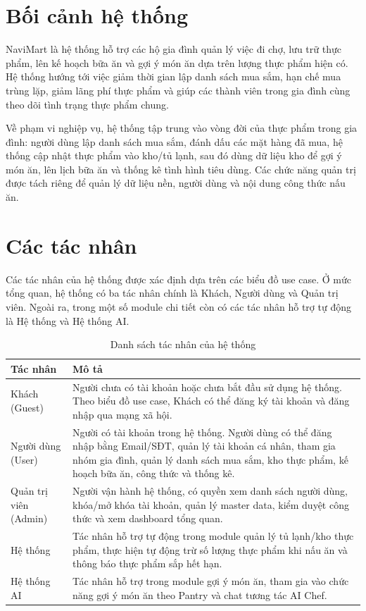 \section{Bối cảnh hệ thống}
NaviMart là hệ thống hỗ trợ các hộ gia đình quản lý việc đi chợ, lưu trữ thực phẩm, lên kế hoạch bữa ăn và gợi ý món ăn dựa trên lượng thực phẩm hiện có. Hệ thống hướng tới việc giảm thời gian lập danh sách mua sắm, hạn chế mua trùng lặp, giảm lãng phí thực phẩm và giúp các thành viên trong gia đình cùng theo dõi tình trạng thực phẩm chung.

Về phạm vi nghiệp vụ, hệ thống tập trung vào vòng đời của thực phẩm trong gia đình: người dùng lập danh sách mua sắm, đánh dấu các mặt hàng đã mua, hệ thống cập nhật thực phẩm vào kho/tủ lạnh, sau đó dùng dữ liệu kho để gợi ý món ăn, lên lịch bữa ăn và thống kê tình hình tiêu dùng. Các chức năng quản trị được tách riêng để quản lý dữ liệu nền, người dùng và nội dung công thức nấu ăn.

\section{Các tác nhân}
Các tác nhân của hệ thống được xác định dựa trên các biểu đồ use case. Ở mức tổng quan, hệ thống có ba tác nhân chính là Khách, Người dùng và Quản trị viên. Ngoài ra, trong một số module chi tiết còn có các tác nhân hỗ trợ tự động là Hệ thống và Hệ thống AI.

\begin{table}[H]
    \centering
    \caption{Danh sách tác nhân của hệ thống}
    \begin{tabular}{|p{3.4cm}|p{9.9cm}|}
        \hline
        \cellcolor[HTML]{D5F5E3}\textbf{Tác nhân} & \cellcolor[HTML]{D5F5E3}\textbf{Mô tả} \\ \hline
        Khách (Guest) & Người chưa có tài khoản hoặc chưa bắt đầu sử dụng hệ thống. Theo biểu đồ use case, Khách có thể đăng ký tài khoản và đăng nhập qua mạng xã hội. \\ \hline
        Người dùng (User) & Người có tài khoản trong hệ thống. Người dùng có thể đăng nhập bằng Email/SĐT, quản lý tài khoản cá nhân, tham gia nhóm gia đình, quản lý danh sách mua sắm, kho thực phẩm, kế hoạch bữa ăn, công thức và thống kê. \\ \hline
        Quản trị viên (Admin) & Người vận hành hệ thống, có quyền xem danh sách người dùng, khóa/mở khóa tài khoản, quản lý master data, kiểm duyệt công thức và xem dashboard tổng quan. \\ \hline
        Hệ thống & Tác nhân hỗ trợ tự động trong module quản lý tủ lạnh/kho thực phẩm, thực hiện tự động trừ số lượng thực phẩm khi nấu ăn và thông báo thực phẩm sắp hết hạn. \\ \hline
        Hệ thống AI & Tác nhân hỗ trợ trong module gợi ý món ăn, tham gia vào chức năng gợi ý món ăn theo Pantry và chat tương tác AI Chef. \\ \hline
    \end{tabular}
\end{table}

